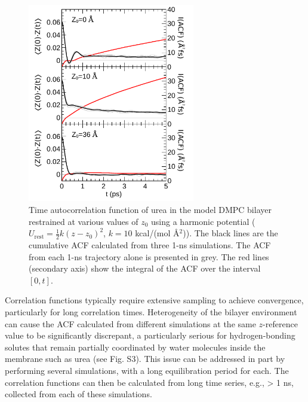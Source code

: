 \begin{figure}
\begin{center}
\includegraphics[width=0.65\textwidth]{Figures/acf-stacked}
\caption[Time autocorrelation function of urea in model DMPC bilayer]{Time autocorrelation function of urea in the model DMPC bilayer
restrained at various values of $z_0$ using a harmonic potential
($U_\mathrm{rest}=\frac{1}{2}k(z-z_0)^2$, $k=10$ kcal/(mol \AA$^2$)).
The black lines are the cumulative ACF calculated from three 1-ns simulations.
The ACF from each 1-ns trajectory alone is presented in grey. The red lines
(secondary axis) show the integral of the ACF over the interval $[0,t]$.}
\label{fig:acf}
\end{center}
\end{figure}

\par Correlation functions typically require extensive sampling to achieve convergence, particularly for long correlation times. Heterogeneity of the bilayer environment can cause the ACF calculated from different simulations at the same $z$-reference value to be significantly discrepant, a particularly serious for hydrogen-bonding solutes that remain partially coordinated by water molecules inside the membrane such as urea (see Fig. S3). This issue can be addressed in part by performing several simulations, with a long equilibration period for each. The correlation functions can then be calculated from long time series, e.g., > 1 ns, collected from each of these simulations.

